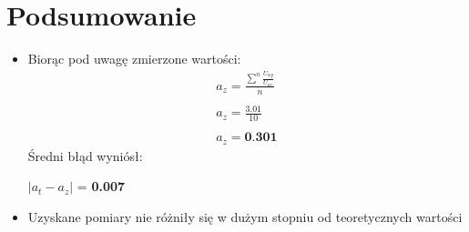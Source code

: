 \section{Podsumowanie}

\begin{itemize}
    \item Biorąc pod uwagę zmierzone wartości:
    \begin{gather}
       a_z = \frac {\sum^{n} \frac{U_{wy}}{U_{we}}}{n} \\\\
       a_z = \frac{3.01}{10} \\\\
       a_z = \textbf{0.301}
    \end{gather}
    Średni błąd wyniósł:
    \begin{center}
        $|a_t - a_z|$ = \textbf{0.007} \\
    \end{center}
    
    \item Uzyskane pomiary nie różniły się w dużym stopniu od teoretycznych wartości
\end{itemize}

